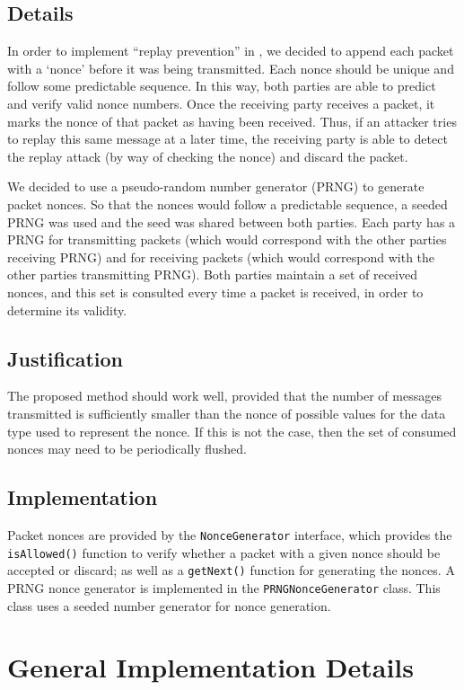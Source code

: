 \documentclass[a4paper,11pt]{article}
\begin{document}
\subsection{Details}
In order to implement ``replay prevention'' in \packageName{}, we decided to
append each packet with a `nonce' before it was being transmitted. Each nonce
should be unique and follow some predictable sequence. In this way, both parties
are able to predict and verify valid nonce numbers. Once the receiving party
receives a packet, it marks the nonce of that packet as having been received.
Thus, if an attacker tries to replay this same message at a later time, the
receiving party is able to detect the replay attack (by way of checking the
nonce) and discard the packet.

We decided to use a pseudo-random number generator (PRNG) to generate packet
nonces. So that the nonces would follow a predictable sequence, a seeded PRNG
was used and the seed was shared between both parties. Each party has a PRNG for
transmitting packets (which would correspond with the other parties receiving
PRNG) and for receiving packets (which would correspond with the other parties
transmitting PRNG). Both parties maintain a set of received nonces, and this
set is consulted every time a packet is received, in order to determine its
validity.

\subsection{Justification}
The proposed method should work well, provided that the number of messages
transmitted is sufficiently smaller than the nonce of possible values for the
data type used to represent the nonce. If this is not the case, then the set of
consumed nonces may need to be periodically flushed.

\subsection{Implementation}
Packet nonces are provided by the \verb+NonceGenerator+ interface, which
provides the \verb+isAllowed()+ function to verify whether a packet with a given
nonce should be accepted or discard; as well as a \verb+getNext()+ function for
generating the nonces. A PRNG nonce generator is implemented in the
\verb+PRNGNonceGenerator+ class. This class uses a seeded number generator for
nonce generation.

\section{General Implementation Details}
\end{document}
